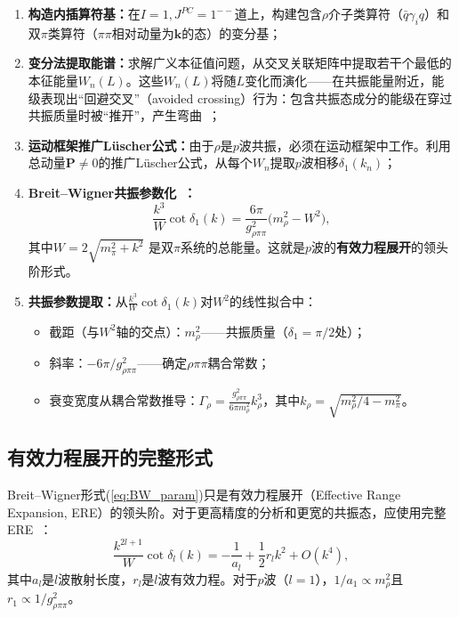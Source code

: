\documentclass[12pt,a4paper]{ctexart}
\theoremstyle{definition}
\begin{document}
\begin{enumerate}[leftmargin=*]
    \item \textbf{构造内插算符基：}在$I=1, J^{PC}=1^{--}$道上，构建包含$\rho$介子类算符（$\bar{q}\gamma_i q$）和双$\pi$类算符（$\pi\pi$相对动量为$\mathbf{k}$的态）的变分基；

    \item \textbf{变分法提取能谱：}求解广义本征值问题，从交叉关联矩阵中提取若干个最低的本征能量$W_n(L)$。这些$W_n(L)$将随$L$变化而演化——在共振能量附近，能级表现出``回避交叉''（avoided crossing）行为：包含共振态成分的能级在穿过共振质量时被``推开''，产生弯曲~\cite{GattringerLang2010}；

    \item \textbf{运动框架推广L\"uscher公式：}由于$\rho$是$p$波共振，必须在运动框架中工作。利用总动量$\mathbf{P} \neq 0$的推广L\"uscher公式，从每个$W_n$提取$p$波相移$\delta_1(k_n)$；

    \item \textbf{Breit--Wigner共振参数化~\cite{decayChannels2026}：}
    \begin{equation}\label{eq:BW_param}
        \boxed{\frac{k^3}{W}\cot\delta_1(k) = \frac{6\pi}{g_{\rho\pi\pi}^2}\bigl(m_\rho^2 - W^2\bigr),}
    \end{equation}
    其中$W = 2\sqrt{m_\pi^2 + k^2}$ 是双$\pi$系统的总能量。这就是$p$波的\textbf{有效力程展开}的领头阶形式。

    \item \textbf{共振参数提取：}从$\frac{k^3}{W}\cot\delta_1(k)$对$W^2$的线性拟合中：
    \begin{itemize}
        \item 截距（与$W^2$轴的交点）：$m_\rho^2$——共振质量（$\delta_1 = \pi/2$处）；
        \item 斜率：$-6\pi/g_{\rho\pi\pi}^2$——确定$\rho\pi\pi$耦合常数；
        \item 衰变宽度从耦合常数推导：$\Gamma_\rho = \frac{g_{\rho\pi\pi}^2}{6\pi m_\rho^2} k_\rho^3$，其中$k_\rho = \sqrt{m_\rho^2/4 - m_\pi^2}$。
    \end{itemize}
\end{enumerate}

\subsection{有效力程展开的完整形式}

Breit--Wigner形式(\ref{eq:BW_param})只是有效力程展开（Effective Range Expansion, ERE）的领头阶。对于更高精度的分析和更宽的共振态，应使用完整ERE~\cite{GattringerLang2010}：
\begin{equation}\label{eq:ERE}
    \frac{k^{2l+1}}{W}\cot\delta_l(k) = -\frac{1}{a_l} + \frac{1}{2}r_l k^2 + O(k^4),
\end{equation}
其中$a_l$是$l$波散射长度，$r_l$是$l$波有效力程。对于$p$波（$l=1$），$1/a_1 \propto m_\rho^2$且$r_1 \propto 1/g_{\rho\pi\pi}^2$。
\end{document}
